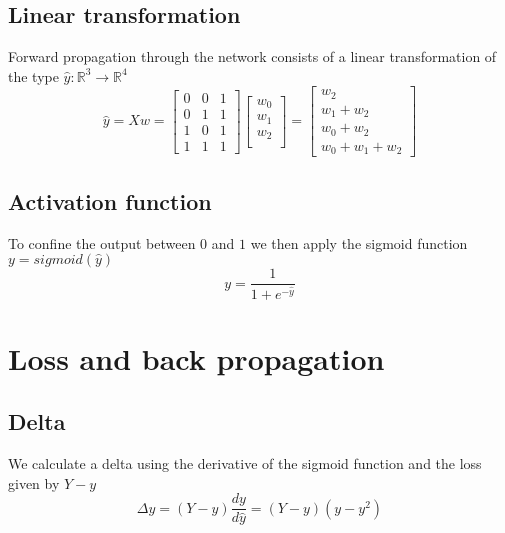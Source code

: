 \documentclass[10pt,a4paper]{article}
\begin{document}
\subsection{Linear transformation}
Forward propagation through the network consists of a linear transformation of the type $\hat{y}: \mathbb{R}^3 \to \mathbb{R}^4$
\begin{equation}
	\hat{y} = Xw =
	\begin{bmatrix}
		0 & 0 & 1 \\
		0 & 1 & 1 \\
		1 & 0 & 1 \\
		1 & 1 & 1
	\end{bmatrix}
	\begin{bmatrix}
		w_0 \\
		w_1 \\
		w_2 \\
	\end{bmatrix}
	=
	\begin{bmatrix}
		w_2 \\
		w_1 + w_2 \\
		w_0 + w_2 \\
		w_0 + w_1 + w_2
	\end{bmatrix}
\end{equation}
\subsection{Activation function}
To confine the output between $0$ and $1$ we then apply the sigmoid function $y = sigmoid(\hat{y})$
\begin{equation}
	y = \frac{1}{1+e^{-\hat{y}}}
\end{equation}

\newpage

\section{Loss and back propagation}
\subsection{Delta}
We calculate a delta using the derivative of the sigmoid function and the loss given by $Y-y$
\begin{equation}
	\Delta{y} = (Y-y)\frac{dy}{d\hat{y}} = (Y-y)(y-y^2)
\end{equation}
\end{document}
